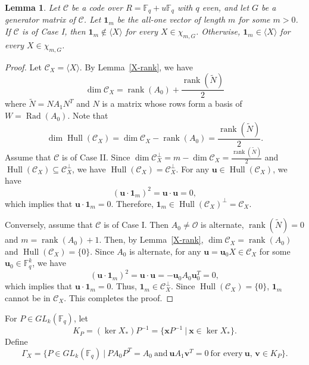 \documentclass{article}
\newtheorem{lemma}[theorem]{Lemma}
\theoremstyle{definition}
\theoremstyle{remark}
\begin{document}
\begin{lemma}\label{allonevector}
    Let $\mathcal{C}$ be a code over $R=\mathbb{F}_q+u\mathbb{F}_q$ with $q$ even, and let $G$ be a generator matrix of $\mathcal{C}$. Let $\mathbf{1}_m$ be the all-one vector of length $m$ for some $m>0$. If $\mathcal{C}$ is of Case I, then $\mathbf{1}_m\notin \langle X\rangle$ for every $X\in \chi_{m, G}$. Otherwise, $\mathbf{1}_m\in \langle X\rangle$ for every $X\in \chi_{m, G}$.
\end{lemma}
\begin{proof}
    Let $\mathcal{C}_X=\langle X\rangle$. By Lemma~\ref{X-rank}, we have
    \[
    \dim \mathcal{C}_X=\operatorname{rank}(A_0)+\frac{\operatorname{rank}(\tilde{N})}{2}
    \]
    where $\tilde{N}=NA_1N^T$ and $N$ is a matrix whose rows form a basis of $W=\operatorname{Rad}(A_0)$. Note that 
    \[
    \dim\operatorname{Hull}(\mathcal{C}_X)=\dim\mathcal{C}_X-\operatorname{rank}(A_0)=\frac{\operatorname{rank}(\tilde{N})}{2}.
    \]
    Assume that $\mathcal{C}$ is of Case II. Since $\dim \mathcal{C}_X^\perp=m-\dim\mathcal{C}_X=\frac{\operatorname{rank}(\tilde{N})}{2}$ and $\operatorname{Hull}(\mathcal{C}_X)\subseteq \mathcal{C}_X^\perp$, we have $\operatorname{Hull}(\mathcal{C}_X)= \mathcal{C}_X^\perp$. For any $\mathbf{u}\in \operatorname{Hull}(\mathcal{C}_X)$, we have
    \[
    (\mathbf{u}\cdot \mathbf{1}_m)^2= \mathbf{u}\cdot\mathbf{u}=0,
    \]
    which implies that $\mathbf{u}\cdot \mathbf{1}_m=0$. Therefore, $\mathbf{1}_m\in \operatorname{Hull}(\mathcal{C}_X)^\perp=\mathcal{C}_X$.

    Conversely, assume that $\mathcal{C}$ is of Case I. Then $A_0\ne \mathcal{O}$ is alternate, $\operatorname{rank}(\tilde{N})=0$ and $m=\operatorname{rank}(A_0)+1$. Then, by Lemma~\ref{X-rank}, $\dim\mathcal{C}_X=\operatorname{rank}(A_0)$ and $\operatorname{Hull}(\mathcal{C}_X)=\{0\}$. Since $A_0$ is alternate, for any $\mathbf{u}=\mathbf{u}_0X\in \mathcal{C}_X$ for some $\mathbf{u}_0\in \mathbb{F}_q^k$, we have
    \[
   (\mathbf{u}\cdot \mathbf{1}_m)^2= \mathbf{u}\cdot\mathbf{u}=-\mathbf{u}_0A_0\mathbf{u}_0^T=0,
    \]
    which implies that $\mathbf{u}\cdot \mathbf{1}_m=0$. Thus, $\mathbf{1}_m\in \mathcal{C}_X^\perp$. Since $\operatorname{Hull}(\mathcal{C}_X)=\{0\}$, $\mathbf{1}_m$ cannot be in $\mathcal{C}_X$. This completes the proof.
\end{proof}

For $P\in GL_k(\mathbb{F}_q)$, let
    \[
    K_P=(\ker X_*)P^{-1}=\{\mathbf{x}P^{-1}~|~\mathbf{x}\in \ker X_*\}.
    \]
Define
    \[
    \Gamma_X=\{P\in GL_k(\mathbb{F}_q)~|~PA_0P^T=A_0~\mbox{and}~\mathbf{u}A_1\mathbf{v}^T=0~\mbox{for every}~\mathbf{u},\, \mathbf{v}\in K_P\}.
    \]
\end{document}
